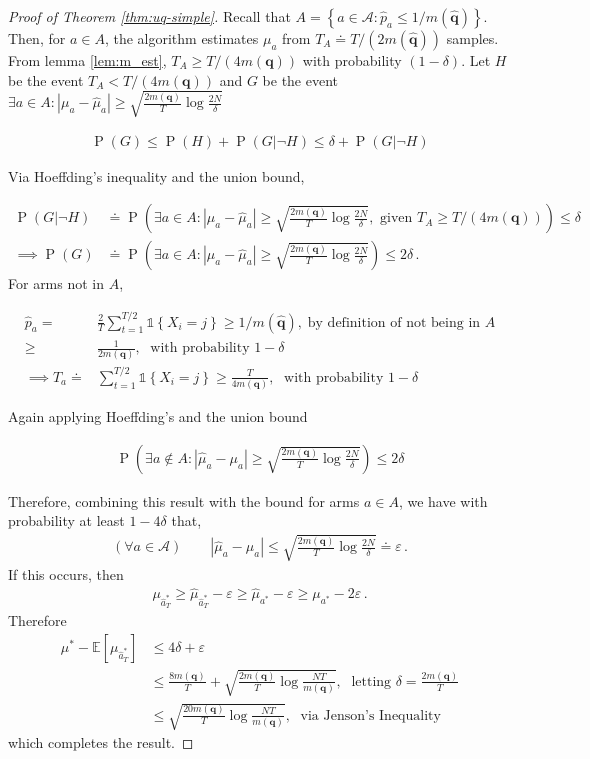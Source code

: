 \documentclass[11pt,a4paper,twoside]{report}
\newcommand{\EE}{\mathbb E}
\newcommand{\actions}{\mathcal{A}}
\newcommand{\set}[1]{\left\{#1\right\}}
\newcommand{\ind}[1]{\mathds{1}\!\!\set{#1}}
\newcommand{\eq}[1]{\begin{align*}#1\end{align*}}
\renewcommand{\P}[1]{\operatorname{P}\left(#1\right)}
\renewcommand{\vec}[1]{\boldsymbol{#1}}
\theoremstyle{plain}
\theoremstyle{definition}
\let\epsilon\varepsilon
\begin{document}
\begin{proof}[Proof of Theorem \ref{thm:uq-simple}]
Recall that $A = \set{a \in \actions : \hat p_a \leq 1/m(\vec{\hat q})}$. Then,
for $a \in A$, the algorithm estimates $\mu_a$ from $T_A \doteq T/(2m(\vec{\hat q}))$ samples. From lemma \ref{lem:m_est}, $T_A  \geq T/(4m(\vec{q}))$ with probability $(1-\delta)$. Let $H$ be the event $T_A < T/(4m(\vec{q}))$ and $G$ be the event $\exists a \in A : |\mu_a - \hat \mu_a| \geq \sqrt{\frac{2m(\vec{q})}{T} \log\frac{2N}{\delta}}$

\eq{
\P{G} \leq \P{H} + \P{G|\neg H} \leq \delta + \P{G|\neg H}
}

Via Hoeffding's inequality and the union bound, 

\eq{
\P{G|\neg H}&\doteq \P{\exists a \in A : |\mu_a - \hat \mu_a| \geq \sqrt{\frac{2m(\vec{q})}{T} \log\frac{2N}{\delta}},\text{ given }T_A \geq T/(4m(\vec{q}))} \leq \delta\\
 \implies  \P{G} & \doteq \P{\exists a \in A : |\mu_a - \hat \mu_a| \geq \sqrt{\frac{2m(\vec{q})}{T} \log\frac{2N}{\delta}}} \leq 2\delta\,.
}
For arms not in $A$,

\eq{
\hat p_a = & \frac{2}{T} \sum_{t=1}^{T/2} \ind{X_i = j} \geq 1/m(\vec{\hat q}), \; \text {by definition of not being in $A$}\\
 \geq & \frac{1}{2m(\vec{q})},\; \text{ with probability } 1-\delta \\
\implies  T_a \doteq & \sum_{t=1}^{T/2} \ind{X_i = j} \geq  \frac{T}{4m(\vec{q})},\; \text{ with probability } 1-\delta
}

Again applying Hoeffding's and the union bound

\eq{
\P{\exists a \notin A:  \left|\hat \mu_a - \mu_a\right| \geq \sqrt{\frac{2m(\vec{q})}{T} \log \frac{2N}{\delta}}} \leq 2\delta
}


Therefore, combining this result with the bound for arms $a \in A$, we have with probability at least $1 - 4\delta$ that,
\eq{
(\forall a \in \actions) \qquad |\hat \mu_a - \mu_a| \leq \sqrt{\frac{2m(\vec{q})}{T} \log \frac{2N}{\delta}} \doteq \epsilon\,.
}
If this occurs, then 
\eq{
\mu_{\hat a^*_T} \geq \hat \mu_{\hat a^*_T} - \epsilon \geq \hat \mu_{a^*} - \epsilon \geq \mu_{a^*} - 2\epsilon\,.
}
Therefore
\eq{
\mu^* - \EE[\mu_{\hat a^*_T}] 
& \leq 4\delta + \epsilon\\
& \leq \frac{8m(\vec{q})}{T} + \sqrt{\frac{2m(\vec{q})}{T} \log \frac{NT}{m(\vec{q})}},\; \text{ letting } \delta = \frac{2m(\vec{q})}{T}\\
& \leq \sqrt{\frac{20m(\vec{q})}{T} \log \frac{NT}{m(\vec{q})}},\; \text{ via Jenson's Inequality}
}
which completes the result.
\end{proof}
\end{document}
